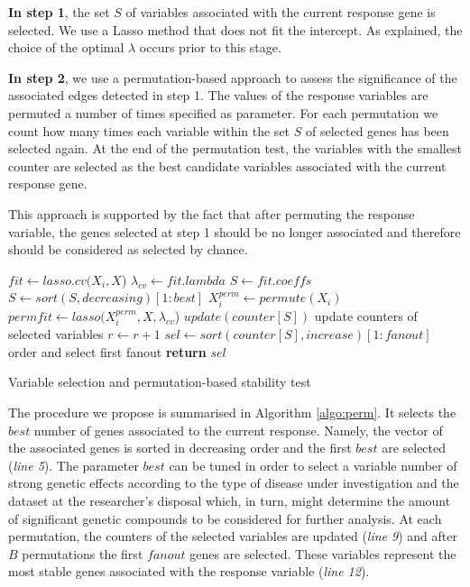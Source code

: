 \textbf{In step 1}, the set $S$ of variables associated with the current response gene is selected. We use a Lasso method that does not fit the intercept. As explained, the choice of the optimal $\lambda$ occurs prior to this stage.

\textbf{In step 2}, we use a permutation-based approach to assess the significance of the associated edges detected in step 1. The values of the response variables are permuted a number of times specified as parameter. For each permutation we count how many times each variable within the set $S$ of selected genes has been selected again. At the end of the permutation test, the variables with the smallest counter are selected as the best candidate variables associated with the current response gene. 

This approach is supported by the fact that after permuting the response variable, the genes selected at step 1 should be no longer associated and therefore should be considered as selected by chance. 

\begin{algorithm}
 \begin{algorithmic}[1]
 \State $fit \gets lasso.cv(X_i,X$)
 \State $\lambda_{cv} \gets fit.lambda$
 \State $S \gets fit.coeffs$
 \State $S \gets sort(S, decreasing)[1:best] $ 
 \State $X^{perm}_i \gets permute(X_i)$
 \State $permfit \gets lasso(X^{perm}_i, X, \lambda_{cv}$)
 \State $update(counter[S])$  update counters of selected variables 
 \State $r\gets r+1$
 \EndWhile
 \State $sel\gets sort(counter[S], increase)[1:fanout] $ order and select first fanout
 \State \textbf{return} $sel$ 
 \EndProcedure
 \end{algorithmic}
 \caption{Variable selection and permutation-based stability test}
 \label{algo:perm}
\end{algorithm}

The procedure we propose is summarised in Algorithm \ref{algo:perm}. 
It selects the $best$ number of genes associated to the current response. Namely, the vector of the associated genes is sorted in decreasing order and the first $best$ are selected (\emph{line 5}). The parameter $best$ can be tuned in order to select a variable number of strong genetic effects according to the type of disease under investigation and the dataset at the researcher's disposal which, in turn, might determine the amount of significant genetic compounds to be considered for further analysis.   
At each permutation, the counters of the selected variables are updated (\emph{line 9}) and after $B$ permutations the first $fanout$ genes are selected. These variables represent the most stable genes associated with the response variable (\emph{line 12}).

